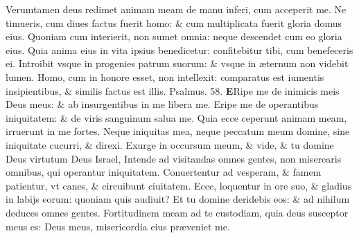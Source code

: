 \documentclass[a5paper,10pt]{book}
\def\ae{æ}
\begin{document}
\begin{multicols*}{2}
\newline \color{red} V\color{black}erumtamen deus redimet animam meam de manu inferi, cum acceperit me.
\newline \color{red} N\color{black}e timueris, cum diues factus fuerit homo: \& cum multiplicata fuerit gloria domus eius.
\newline \color{red} Q\color{black}uoniam cum interierit, non sumet omnia: neque descendet cum eo gloria eius.
\newline \color{red} Q\color{black}uia anima eius in vita ipsius benedicetur: confitebitur tibi, cum benefeceris ei.
\newline \color{red} I\color{black}ntroibit vsque in progenies patrum suorum: \& vsque in \ae ternum non videbit lumen.
\newline \color{red} H\color{black}omo, cum in honore esset, non intellexit: comparatus est iumentis insipientibus, \& similis factus est illis.
\newline \color{red} Psalmus. 58. \color{black}
\vspace{-1em}
\lettrine[lines=2]{\bfseries \color{red} E}{}Ripe me de inimicis meis Deus meus: \& ab insurgentibus in me libera me.
\newline \color{red} E\color{black}ripe me de operantibus iniquitatem: \& de viris sanguinum salua me.
\newline \color{red} Q\color{black}uia ecce ceperunt animam meam, irruerunt in me fortes.
\newline \color{red} N\color{black}eque iniquitas mea, neque peccatum meum domine, sine iniquitate cucurri, \& direxi.
\newline \color{red} E\color{black}xurge in occursum meum, \& vide, \& tu domine Deus virtutum Deus Israel,
\newline \color{red} I\color{black}ntende ad visitandas omnes gentes, non miserearis omnibus, qui operantur iniquitatem.
\newline \color{red} C\color{black}onuertentur ad vesperam, \& famem patientur, vt canes, \& circuibunt ciuitatem.
\newline \color{red} E\color{black}cce, loquentur in ore suo, \& gladius in labijs eorum: quoniam quis audiuit?
\newline \color{red} E\color{black}t tu domine deridebis eos: \& ad nihilum deduces omnes gentes.%
\newline \color{red} F\color{black}ortitudinem meam ad te custodiam, quia deus susceptor meus es: Deus meus, misericordia eius pr\ae veniet me.

\end{multicols*}
\end{document}
